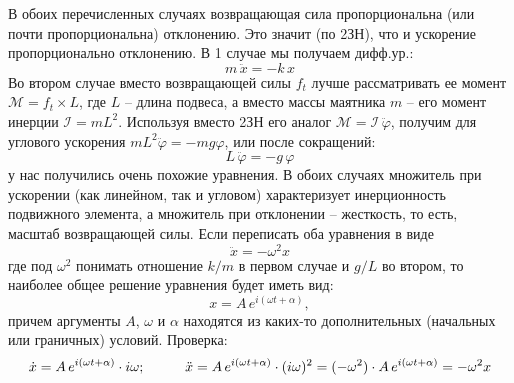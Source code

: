 В обоих перечисленных случаях возвращающая сила пропорциональна (или почти пропорциональна) отклонению. Это значит (по 2ЗН), что и ускорение пропорционально отклонению. В 1 случае мы получаем дифф.ур.:\vspace{-3mm}
\begin{equation}
m\,\ddot{x}=-k\,x
\end{equation}
Во втором случае вместо возвращающей силы $f_t$ лучше рассматривать ее момент $\mathcal{M}=f_t\times L$, где $L$ -- длина подвеса, а вместо массы маятника $m$ -- его момент инерции $\mathcal{I}=mL^2$. Используя вместо 2ЗН его аналог $\mathcal{M=I}\,\ddot{\varphi}$, получим для углового ускорения $mL^2\ddot{\varphi}=-mg\varphi$, или после сокращений:\vspace{-5mm}
\begin{equation}
L\,\ddot{\varphi}=-g\,\varphi
\end{equation}
у нас получились очень похожие уравнения. В обоих случаях множитель при ускорении (как линейном, так и угловом) характеризует инерционность подвижного элемента, а множитель при отклонении -- жесткость, то есть, масштаб возвращающей силы. Если переписать оба уравнения в виде
\begin{displaymath}
\ddot{x}=-\omega^2x
\end{displaymath}
где под $\omega^2$ понимать отношение $k/m$ в первом случае и $g/L$ во втором, то наиболее общее решение уравнения будет иметь вид:
\begin{equation}
x=A\,e^{i(\omega t+\alpha)},
\end{equation}
 причем аргументы $A$, $\omega$ и $\alpha$ находятся из каких-то дополнительных (на\-чаль\-ных или граничных) условий. Проверка:
\begin{displaymath}
\dot{x}=A\,e^{i(\omega t+\alpha)}\cdot i\omega;\hspace{10mm}\ddot{x}=
A\,e^{i(\omega t+\alpha)}\cdot (i\omega)^2=(-\omega^2)\cdot A\,e^{i(\omega t+\alpha)}
=-\omega^2x
\end{displaymath}
